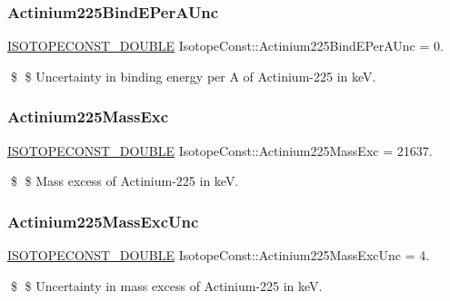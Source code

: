 \subsubsection{\texorpdfstring{Actinium225\+Bind\+E\+Per\+A\+Unc}{Actinium225BindEPerAUnc}}
{\footnotesize\ttfamily \mbox{\hyperlink{group___isotope_const-_macros_ga8f45a7272ce02c0b4c65c44636ed719a}{I\+S\+O\+T\+O\+P\+E\+C\+O\+N\+S\+T\+\_\+\+D\+O\+U\+B\+LE}} Isotope\+Const\+::\+Actinium225\+Bind\+E\+Per\+A\+Unc = 0.}

\$ \$ Uncertainty in binding energy per A of Actinium-\/225 in keV. \mbox{\label{group___isotope_const-_actinium-_ac225_gaae4652ba573fe3f5196ca296dac2936c}} 
\subsubsection{\texorpdfstring{Actinium225\+Mass\+Exc}{Actinium225MassExc}}
{\footnotesize\ttfamily \mbox{\hyperlink{group___isotope_const-_macros_ga8f45a7272ce02c0b4c65c44636ed719a}{I\+S\+O\+T\+O\+P\+E\+C\+O\+N\+S\+T\+\_\+\+D\+O\+U\+B\+LE}} Isotope\+Const\+::\+Actinium225\+Mass\+Exc = 21637.}

\$ \$ Mass excess of Actinium-\/225 in keV. \mbox{\label{group___isotope_const-_actinium-_ac225_gaeb2eb640f5aa2d77dbe10c27ae6c2fc3}} 
\subsubsection{\texorpdfstring{Actinium225\+Mass\+Exc\+Unc}{Actinium225MassExcUnc}}
{\footnotesize\ttfamily \mbox{\hyperlink{group___isotope_const-_macros_ga8f45a7272ce02c0b4c65c44636ed719a}{I\+S\+O\+T\+O\+P\+E\+C\+O\+N\+S\+T\+\_\+\+D\+O\+U\+B\+LE}} Isotope\+Const\+::\+Actinium225\+Mass\+Exc\+Unc = 4.}

\$ \$ Uncertainty in mass excess of Actinium-\/225 in keV. \mbox{\label{group___isotope_const-_actinium-_ac225_ga97b7023052e0a88d072afe584b38b5a4}} 

